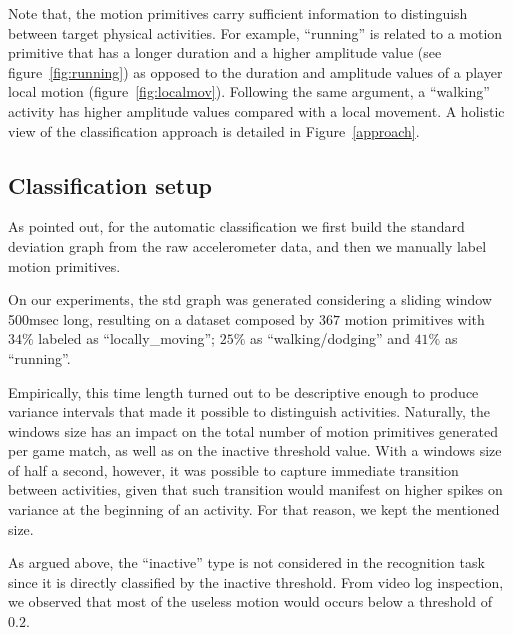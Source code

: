 
Note that, the motion primitives carry sufficient information to distinguish between target physical activities. For example, ``running'' is related to a motion primitive that has a longer duration and a higher amplitude value (see figure~\ref{fig:running}) as opposed to the duration and amplitude values of a player local motion (figure~\ref{fig:localmov}). Following the same argument, a ``walking'' activity has higher amplitude values compared with a local movement. A holistic view of the classification approach is detailed in Figure~\ref{approach}. 

\subsection{Classification setup}

As pointed out, for the automatic classification we first build the standard deviation graph from the raw accelerometer data, and then we manually label motion primitives. 

On our experiments, the std graph was generated considering a sliding window 500msec long, resulting on a dataset composed by $367$ motion primitives with $34\%$ labeled as ``locally\_moving''; $25\%$ as ``walking/dodging'' and $41\%$ as ``running''.%

Empirically, this time length turned out to be descriptive enough to produce variance intervals that made it possible to distinguish activities. Naturally, the windows size has an impact on the total number of motion primitives generated per game match, as well as on the inactive threshold value. With a windows size of half a second, however, it was possible to capture immediate transition between activities, given that such transition would manifest on higher spikes on variance at the beginning of an activity. For that reason, we kept the mentioned size. 

As argued above, the ``inactive'' type is not considered in the recognition task since it is directly classified by the inactive threshold. From video log inspection, we observed that most of the useless motion would occurs below a threshold of $0.2$. 

